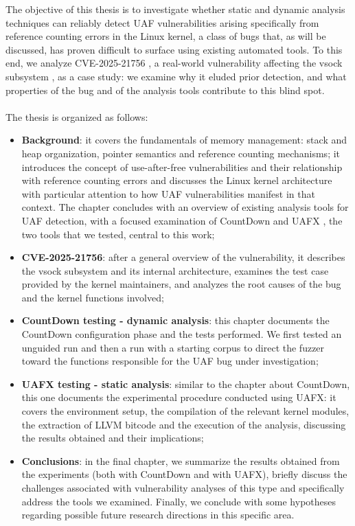 The objective of this thesis is to investigate whether static and dynamic analysis techniques can reliably detect UAF vulnerabilities arising specifically from reference counting errors in the Linux kernel, a class of bugs that, as will be discussed, has proven difficult to surface using existing automated tools. To this end, we analyze CVE-2025-21756 \cite{bib:cve-2025-21756}, a real-world vulnerability affecting the vsock subsystem \cite{bib:af-vsock}, as a case study: we examine why it eluded prior detection, and what properties of the bug and of the analysis tools contribute to this blind spot.
\\\\
The thesis is organized as follows:
\begin{itemize}
    \item \textbf{Background}: it covers the fundamentals of memory management: stack and heap organization, pointer semantics and reference counting mechanisms; it introduces the concept of use-after-free vulnerabilities and their relationship with reference counting errors and discusses the Linux kernel architecture with particular attention to how UAF vulnerabilities manifest in that context. The chapter concludes with an overview of existing analysis tools for UAF detection, with a focused examination of CountDown \cite{bib:countdown} and UAFX \cite{bib:uafx}, the two tools that we tested, central to this work;

    \item \textbf{CVE-2025-21756}: after a general overview of the vulnerability, it describes the vsock subsystem and its internal architecture, examines the test case provided by the kernel maintainers, and analyzes the root causes of the bug and the kernel functions involved;

    \item \textbf{CountDown  testing - dynamic analysis}: this chapter documents the CountDown configuration phase and the tests performed. We first tested an unguided run and then a run with a starting corpus to direct the fuzzer toward the functions responsible for the UAF bug under investigation;

    \item \textbf{UAFX testing - static analysis}: similar to the chapter about CountDown, this one documents the experimental procedure conducted using UAFX: it covers the environment setup, the compilation of the relevant kernel modules, the extraction of LLVM \cite{bib:llvm} bitcode and the execution of the analysis, discussing the results obtained and their implications;
 
    \item \textbf{Conclusions}: in the final chapter, we summarize the results obtained from the experiments (both with CountDown and with UAFX), briefly discuss the challenges associated with vulnerability analyses of this type and specifically address the tools we examined. Finally, we conclude with some hypotheses regarding possible future research directions in this specific area.
\end{itemize}